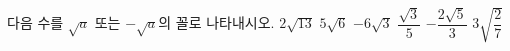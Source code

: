 다음 수를 $\sqrt{a}$ 또는 $-\sqrt{a}$의 꼴로 나타내시오.
 $2\sqrt{13}$
 $5\sqrt{6}$
 $-6\sqrt{3}$
 $\dfrac{\sqrt{3}}{5}$
 $-\dfrac{2\sqrt{5}}{3}$
 $3\sqrt{\dfrac{2}{7}}$

